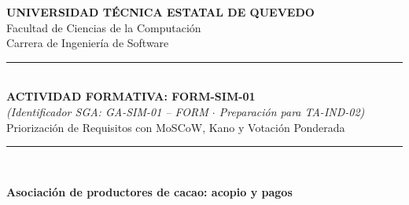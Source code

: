 \documentclass[11pt,a4paper]{article}
\begin{document}
\begin{titlepage}
    \centering
    \vspace*{0.5cm}
    {\Large\textbf{\textcolor{uteqdark}{UNIVERSIDAD T\'ECNICA ESTATAL DE QUEVEDO}}}\\[0.2cm]
    {\large Facultad de Ciencias de la Computaci\'on}\\[0.15cm]
    {\large Carrera de Ingenier\'ia de Software}\\[0.7cm]

    \textcolor{uteqgreen}{\rule{\linewidth}{1.5pt}}\\[0.45cm]
    {\LARGE\textbf{ACTIVIDAD FORMATIVA: FORM-SIM-01}}\\[0.2cm]
    {\large\textit{(Identificador SGA: GA-SIM-01 -- FORM $\cdot$ Preparaci\'on para TA-IND-02)}}\\[0.3cm]
    {\Large Priorizaci\'on de Requisitos con MoSCoW, Kano y Votaci\'on Ponderada}\\[0.45cm]
    \textcolor{uteqgreen}{\rule{\linewidth}{1.5pt}}\\[0.8cm]

    \begin{tcolorbox}[colback=boxbg,colframe=uteqgreen,boxrule=0.8pt,arc=2mm,title={\textbf{Dominio Asignado por Sorteo (N.\textsuperscript{o} 6)}}]
        \centering
        \textbf{Asociaci\'on de productores de cacao: acopio y pagos}
    \end{tcolorbox}

    \vspace{0.6cm}


\end{titlepage}
\end{document}
